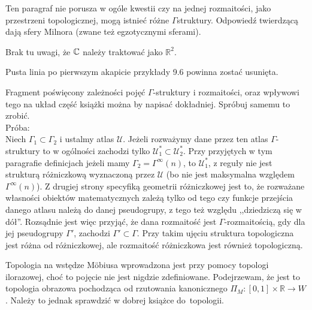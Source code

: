 \documentclass[a4paper,11pt]{article}
\begin{document}
\vspace{\spaceFour}


\start {} Ten paragraf nie porusza w ogóle kwestii czy na jednej
rozmaitości, jako przestrzeni topologicznej, mogą istnieć różne
$\Gamma$\dywiz struktury. Odpowiedź twierdzącą dają sfery Milnora
(zwane też egzotycznymi sferami).

\vspace{\spaceFour}


\start {} Brak tu uwagi, że $\mathbb{C}$ należy traktować jako
$\mathbb{R}^{ 2 }$.

\vspace{\spaceFour}


\start {} Pusta linia po pierwszym akapicie przykłady 9.6
powinna zostać usunięta.

\vspace{\spaceFour}


Fragment poświęcony zależności pojęć $\Gamma$-struktury i rozmaitości,
oraz wpływowi tego na układ część książki można by napisać dokładniej.
Spróbuj samemu to zrobić.
\\Próba:\\
Niech $\Gamma_{ 1 } \subset \Gamma_{ 2 }$ i ustalmy atlas
$\mathcal{ U }$. Jeżeli rozważymy dane przez ten atlas
$\Gamma$-struktury to w ogólności zachodzi tylko
$\mathcal{ U }^{ * }_{ 1 } \subset \mathcal{ U }^{ * }_{ 2 }$. Przy
przyjętych w tym paragrafie definicjach jeżeli mamy
$\Gamma_{ 2 } = \Gamma^{ \infty }( n )$, to
$\mathcal{ U }^{ * }_{ 1 }$, z reguły nie jest strukturą różniczkową
wyznaczoną przez $\mathcal{ U }$ (bo nie jest maksymalna względem
$\Gamma^{ \infty }( n )$). Z drugiej strony specyfiką geometrii
różniczkowej jest to, że rozważane własności obiektów matematycznych
zależą tylko od tego czy funkcje przejścia danego atlasu należą do
danej pseudogrupy, z tego też względu ,,dziedziczą się w dół''.
Rozsądnie jest więc przyjąć, że dana rozmaitość jest
$\Gamma$-rozmaitością, gdy dla jej pseudogrupy $\Gamma'$, zachodzi
$\Gamma' \subset \Gamma$. Przy takim ujęciu struktura topologiczna
jest różna od różniczkowej, ale rozmaitość różniczkowa
jest również topologiczną.\\

\vspace{\spaceFour}


\start {} Topologia na wstędze M\"obiusa wprowadzona jest przy
pomocy topologi ilorazowej, choć to pojęcie nie jest nigdzie
zdefiniowane. Podejrzewam, że jest to topologia obrazowa pochodząca od
rzutowania kanonicznego
$\Pi_{ M } : [ 0,1 ] \times \mathbb{ R } \to W$. Należy to jednak
sprawdzić w dobrej książce do~topologii.
\end{document}
